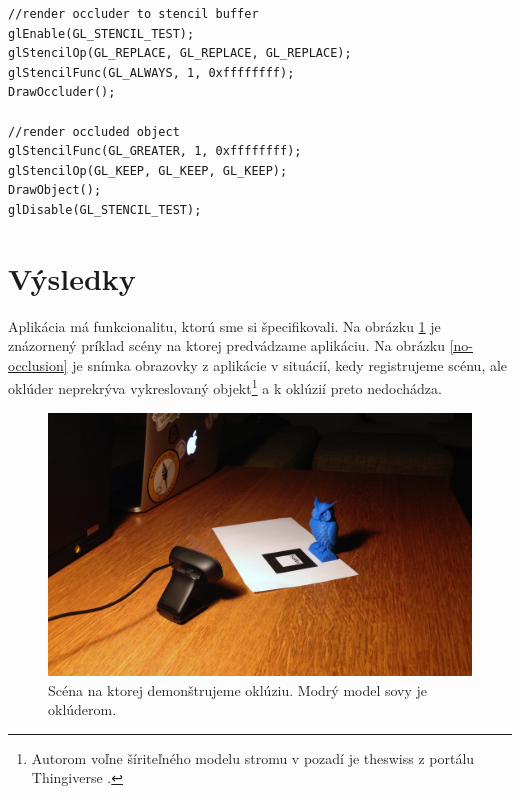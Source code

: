 \begin{lstlisting}[label={okluzia-kod}]
//render occluder to stencil buffer
glEnable(GL_STENCIL_TEST);
glStencilOp(GL_REPLACE, GL_REPLACE, GL_REPLACE);
glStencilFunc(GL_ALWAYS, 1, 0xffffffff);
DrawOccluder();

//render occluded object
glStencilFunc(GL_GREATER, 1, 0xffffffff);
glStencilOp(GL_KEEP, GL_KEEP, GL_KEEP);
DrawObject();
glDisable(GL_STENCIL_TEST);
\end{lstlisting}

\section{Výsledky}

Aplikácia má funkcionalitu, ktorú sme si špecifikovali. Na obrázku \ref{scene} je znázornený príklad scény na ktorej predvádzame aplikáciu. Na obrázku \ref{no-occlusion} je snímka obrazovky z aplikácie v situácií, kedy registrujeme scénu, ale oklúder neprekrýva vykreslovaný objekt\footnote{Autorom voľne šíriteľného modelu stromu v pozadí je theswiss z portálu Thingiverse \cite{theswiss14}.} a k oklúzií preto nedochádza.

\begin{figure}[h]
 \centering
 \includegraphics[max width=\textwidth]{pictures/scene.jpg}
 \caption{Scéna na ktorej demonštrujeme oklúziu. Modrý model sovy je oklúderom.}
 \label{scene}
 \end{figure}

